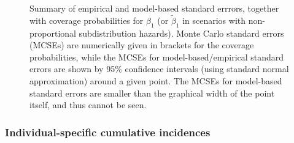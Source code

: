 \documentclass[
  letterpaper,
  paper=240mm:170mm,
  twoside=true,
  open=right,
  fontsize=10pt,
  pagesize=false,
  BCOR=15mm,
  DIV=14,
  headinclude=true,
  footinclude=false,
  headsepline=on]{scrbook}
\begin{document}
\begin{figure}


\caption{\label{fig-perf-X}Summary of empirical and model-based standard
errrors, together with coverage probabilities for \(\beta_1\) (or
\(\tilde{\beta}_1\) in scenarios with non-proportional subdistribution
hazards). Monte Carlo standard errors (MCSEs) are numerically given in
brackets for the coverage probabilities, while the MCSEs for
model-based/empirical standard errors are shown by 95\% confidence
intervals (using standard normal approximation) around a given point.
The MCSEs for model-based standard errors are smaller than the graphical
width of the point itself, and thus cannot be seen.}

\end{figure}%

\subsubsection{Individual-specific cumulative
incidences}\label{individual-specific-cumulative-incidences}
\end{document}

